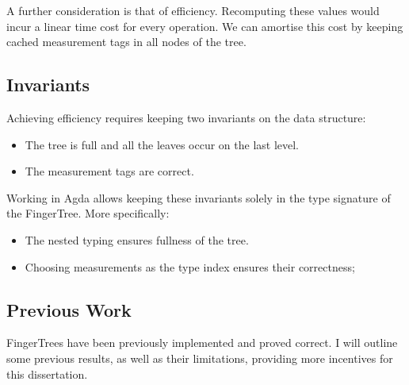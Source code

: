 \documentclass[12pt,twoside,notitlepage]{report}
\begin{document}
A further consideration is that of efficiency. Recomputing these values would incur a linear time cost for every operation. We can amortise this cost by keeping cached measurement tags in all nodes of the tree.

\subsection{Invariants}

Achieving efficiency requires keeping two invariants on the data structure:
\begin{itemize}
	\item The tree is full and all the leaves occur on the last level. 
	\item The measurement tags are correct.
\end{itemize}

Working in Agda allows keeping these invariants solely in the type signature of the FingerTree. More specifically:
\begin{itemize}
	\item The nested typing ensures fullness of the tree.
	\item Choosing measurements as the type index ensures their correctness;
\end{itemize} 

\subsection{Previous Work}

FingerTrees have been previously implemented and proved correct. I will outline some previous results, as well as their limitations, providing more incentives for this dissertation.
\end{document}
